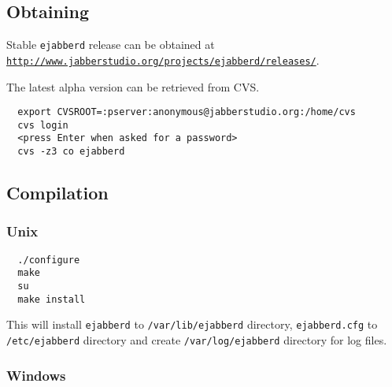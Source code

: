 \documentclass[a4paper,10pt]{article}
\newcommand{\ejabberd}{\texttt{ejabberd}}
\gdef\ahrefurl#1{\href{#1}{\texttt{#1}}}
\begin{document}
\subsection{Obtaining}
\label{sec:obtaining}

Stable \ejabberd{} release can be obtained at
\ahrefurl{http://www.jabberstudio.org/projects/ejabberd/releases/}.

The latest alpha version can be retrieved from CVS\@.
\begin{verbatim}
  export CVSROOT=:pserver:anonymous@jabberstudio.org:/home/cvs
  cvs login
  <press Enter when asked for a password>
  cvs -z3 co ejabberd
\end{verbatim}


\subsection{Compilation}
\label{sec:compilation}
\subsubsection{Unix}
\label{sec:compilationunix}

\begin{verbatim}
  ./configure
  make
  su
  make install
\end{verbatim}

This will install \ejabberd{} to \verb|/var/lib/ejabberd| directory,
\verb|ejabberd.cfg| to \verb|/etc/ejabberd| directory and create
\verb|/var/log/ejabberd| directory for log files.

\subsubsection{Windows}
\label{sec:compilationwin}
\end{document}
